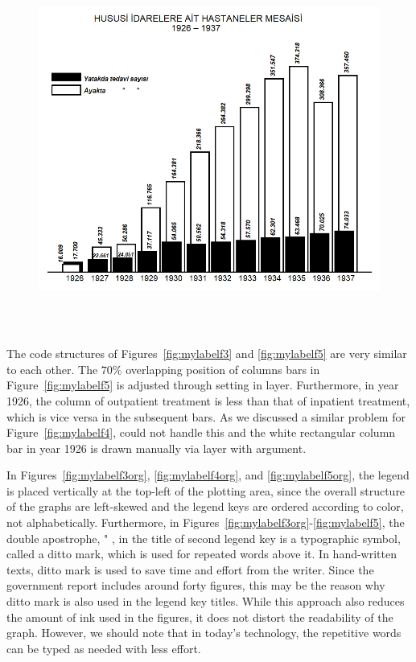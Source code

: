 \begin{figure}[hbt!]
	\centering
	\includegraphics[width=12cm,height=12cm,keepaspectratio]{Hususirep.png}
\end{figure}


The  code structures of Figures~\ref{fig:mylabelf3} and \ref{fig:mylabelf5} are very similar to each other. The $70\%$ overlapping position of columns bars in Figure~\ref{fig:mylabelf5} is adjusted through setting 
 in  layer.
Furthermore, in year 1926, the column of outpatient treatment is less than that of inpatient treatment, which is vice versa in the subsequent bars. As we discussed a similar problem for Figure~\ref{fig:mylabelf4},   could not handle this and the white rectangular column bar in year 1926 is drawn manually via  layer  with  argument. 
	
In Figures~\ref{fig:mylabelf3org}, \ref{fig:mylabelf4org}, and \ref{fig:mylabelf5org}, the legend is placed vertically at the top-left of the plotting area, since the overall structure of the graphs are left-skewed and the legend keys are ordered according to color, not alphabetically. Furthermore, in Figures~\ref{fig:mylabelf3org}-\ref{fig:mylabelf5}, the double apostrophe, " , in the title of second legend key is  a typographic symbol, called  a ditto mark, which is used for repeated words above it. In hand-written texts, ditto mark is used to save time and effort from the writer. Since the government report includes around forty figures, this may be the reason why ditto mark is also used in the legend key titles. While this approach also reduces the amount of ink used in the figures, it does not distort the readability of the graph. However, we should note that in today's technology, the repetitive words can be typed as needed with less effort.

